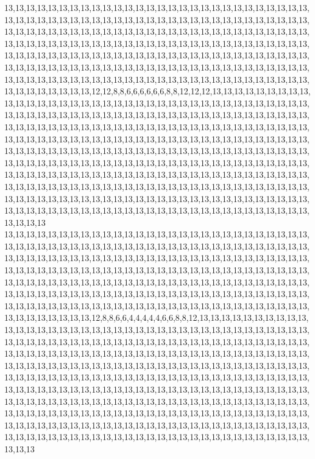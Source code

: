 13,13,13,13,13,13,13,13,13,13,13,13,13,13,13,13,13,13,13,13,13,13,13,13,13,13,13,13,13,13,13,13,13,13,13,13,13,13,13,13,13,13,13,13,13,13,13,13,13,13,13,13,13,13,13,13,13,13,13,13,13,13,13,13,13,13,13,13,13,13,13,13,13,13,13,13,13,13,13,13,13,13,13,13,13,13,13,13,13,13,13,13,13,13,13,13,13,13,13,13,13,13,13,13,13,13,13,13,13,13,13,13,13,13,13,13,13,13,13,13,13,13,13,13,13,13,13,13,13,13,13,13,13,13,13,13,13,13,13,13,13,13,13,13,13,13,13,13,13,13,13,13,13,13,13,13,13,13,13,13,13,13,13,13,13,13,13,13,13,13,13,13,13,13,13,13,13,13,13,13,13,13,13,13,13,13,13,13,13,13,13,13,13,13,13,13,13,13,13,13,13,13,13,13,12,12,8,8,6,6,6,6,6,6,8,8,12,12,12,13,13,13,13,13,13,13,13,13,13,13,13,13,13,13,13,13,13,13,13,13,13,13,13,13,13,13,13,13,13,13,13,13,13,13,13,13,13,13,13,13,13,13,13,13,13,13,13,13,13,13,13,13,13,13,13,13,13,13,13,13,13,13,13,13,13,13,13,13,13,13,13,13,13,13,13,13,13,13,13,13,13,13,13,13,13,13,13,13,13,13,13,13,13,13,13,13,13,13,13,13,13,13,13,13,13,13,13,13,13,13,13,13,13,13,13,13,13,13,13,13,13,13,13,13,13,13,13,13,13,13,13,13,13,13,13,13,13,13,13,13,13,13,13,13,13,13,13,13,13,13,13,13,13,13,13,13,13,13,13,13,13,13,13,13,13,13,13,13,13,13,13,13,13,13,13,13,13,13,13,13,13,13,13,13,13,13,13,13,13,13,13,13,13,13,13,13,13,13,13,13,13,13,13,13,13,13,13,13,13,13,13,13,13,13,13,13,13,13,13,13,13,13,13,13,13,13,13,13,13,13,13,13,13,13,13,13,13,13,13,13,13,13,13,13,13,13,13,13,13,13,13,13,13,13,13,13,13,13,13,13,13,13,13,13,13,13,13,13,13,13,13,13,13,13,13,13,13,13,13,13,13,13,13,13,13,13,13,13,13,13,13,13
13,13,13,13,13,13,13,13,13,13,13,13,13,13,13,13,13,13,13,13,13,13,13,13,13,13,13,13,13,13,13,13,13,13,13,13,13,13,13,13,13,13,13,13,13,13,13,13,13,13,13,13,13,13,13,13,13,13,13,13,13,13,13,13,13,13,13,13,13,13,13,13,13,13,13,13,13,13,13,13,13,13,13,13,13,13,13,13,13,13,13,13,13,13,13,13,13,13,13,13,13,13,13,13,13,13,13,13,13,13,13,13,13,13,13,13,13,13,13,13,13,13,13,13,13,13,13,13,13,13,13,13,13,13,13,13,13,13,13,13,13,13,13,13,13,13,13,13,13,13,13,13,13,13,13,13,13,13,13,13,13,13,13,13,13,13,13,13,13,13,13,13,13,13,13,13,13,13,13,13,13,13,13,13,13,13,13,13,13,13,13,13,13,13,13,13,13,13,13,13,13,13,13,13,12,8,8,6,6,4,4,4,4,4,6,6,8,8,12,13,13,13,13,13,13,13,13,13,13,13,13,13,13,13,13,13,13,13,13,13,13,13,13,13,13,13,13,13,13,13,13,13,13,13,13,13,13,13,13,13,13,13,13,13,13,13,13,13,13,13,13,13,13,13,13,13,13,13,13,13,13,13,13,13,13,13,13,13,13,13,13,13,13,13,13,13,13,13,13,13,13,13,13,13,13,13,13,13,13,13,13,13,13,13,13,13,13,13,13,13,13,13,13,13,13,13,13,13,13,13,13,13,13,13,13,13,13,13,13,13,13,13,13,13,13,13,13,13,13,13,13,13,13,13,13,13,13,13,13,13,13,13,13,13,13,13,13,13,13,13,13,13,13,13,13,13,13,13,13,13,13,13,13,13,13,13,13,13,13,13,13,13,13,13,13,13,13,13,13,13,13,13,13,13,13,13,13,13,13,13,13,13,13,13,13,13,13,13,13,13,13,13,13,13,13,13,13,13,13,13,13,13,13,13,13,13,13,13,13,13,13,13,13,13,13,13,13,13,13,13,13,13,13,13,13,13,13,13,13,13,13,13,13,13,13,13,13,13,13,13,13,13,13,13,13,13,13,13,13,13,13,13,13,13,13,13,13,13,13,13,13,13,13,13,13,13,13,13,13,13,13,13,13,13,13,13,13,13,13,13,13,13
